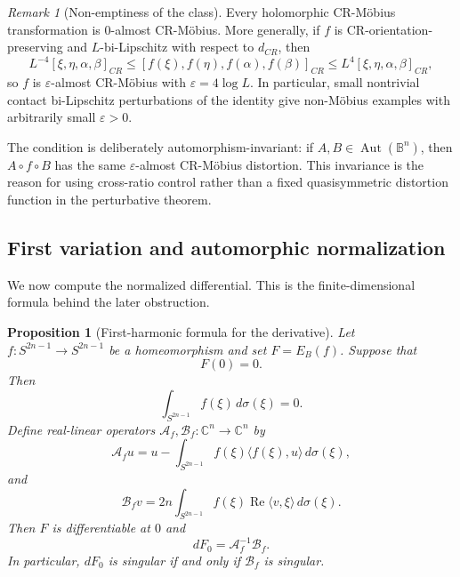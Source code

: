 \documentclass[11pt]{article}
\newtheorem{proposition}[theorem]{Proposition}
\theoremstyle{definition}
\theoremstyle{remark}
\newtheorem{remark}[theorem]{Remark}
\theoremstyle{definition}
\newcommand{\B}{\mathbb B}
\newcommand{\C}{\mathbb C}
\newcommand{\Aut}{\operatorname{Aut}}
\newcommand{\Real}{\operatorname{Re}}
\begin{document}
\begin{remark}[Non-emptiness of the class]\label{remark-nonempty-almost-cr-mobius}
Every holomorphic CR-M\"obius transformation is \(0\)-almost CR-M\"obius.
More generally, if \(f\) is CR-orientation-preserving and \(L\)-bi-Lipschitz
with respect to \(d_{CR}\), then
\[
        L^{-4}[\xi,\eta,\alpha,\beta]_{CR}
        \le
        [f(\xi),f(\eta),f(\alpha),f(\beta)]_{CR}
        \le
        L^4[\xi,\eta,\alpha,\beta]_{CR},
\]
so \(f\) is \(\varepsilon\)-almost CR-M\"obius with
\(\varepsilon=4\log L\).  In particular, small nontrivial contact bi-Lipschitz
perturbations of the identity give non-M\"obius examples with arbitrarily small
\(\varepsilon>0\).
\end{remark}

The condition is deliberately automorphism-invariant: if
\(A,B\in\Aut(\B^n)\), then \(A\circ f\circ B\) has the same
\(\varepsilon\)-almost CR-M\"obius distortion.  This invariance is the reason
for using cross-ratio control rather than a fixed quasisymmetric distortion
function in the perturbative theorem.

\subsection{First variation and automorphic normalization}
\label{section-first-variation}

We now compute the normalized differential.  This is the finite-dimensional
formula behind the later obstruction.

\begin{proposition}[First-harmonic formula for the derivative]
\label{first-harmonic-formula}
Let \(f:S^{2n-1}\to S^{2n-1}\) be a homeomorphism and set
\(F=E_B(f)\). Suppose that
\[
        F(0)=0.
\]
Then
\begin{equation}\label{balanced-condition}
        \int_{S^{2n-1}} f(\xi)\,d\sigma(\xi)=0.
\end{equation}
Define real-linear operators \(\mathcal A_f,\mathcal B_f:\C^n\to\C^n\) by
\begin{equation}\label{Af-definition}
        \mathcal A_f u
        =
        u-
        \int_{S^{2n-1}}
        f(\xi)\langle f(\xi),u\rangle\,d\sigma(\xi),
\end{equation}
and
\begin{equation}\label{Bf-definition}
        \mathcal B_f v
        =
        2n\int_{S^{2n-1}}
        f(\xi)\Real\langle v,\xi\rangle\,d\sigma(\xi).
\end{equation}
Then \(F\) is differentiable at \(0\) and
\begin{equation}\label{derivative-formula}
        dF_0=\mathcal A_f^{-1}\mathcal B_f.
\end{equation}
In particular, \(dF_0\) is singular if and only if \(\mathcal B_f\) is
singular.
\end{proposition}
\end{document}
